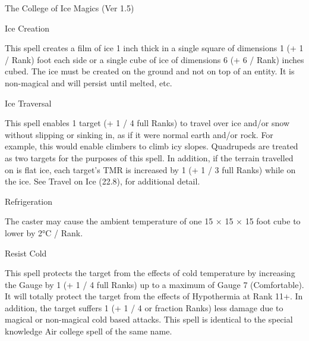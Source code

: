 \begin{Chapter}{The College of Ice Magics (Ver 1.5)}
\begin{spell}[G-3]{Ice Creation}
\begin{effects}
This spell creates a film of ice 1 inch thick in a single square of
dimensions 1 (+ 1 / Rank) foot each side or a single cube of ice of
dimensions 6 (+ 6 / Rank) inches cubed. The ice must be created on the
ground and not on top of an entity.  It is non-magical and will
persist until melted, etc.
\end{effects}
\end{spell}

\begin{spell}[G-4]{Ice Traversal}
\begin{effects}
This spell enables 1 target (+ 1 / 4 full Ranks) to travel over ice
and/or snow without slipping or sinking in, as if it were normal earth
and/or rock. For example, this would enable climbers to climb icy
slopes.  Quadrupeds are treated as two targets for the purposes of
this spell.  In addition, if the terrain travelled on is flat ice,
each target’s TMR is increased by 1 (+ 1 / 3 full Ranks) while on the
ice.  See Travel on Ice (22.8), for additional detail.
\end{effects}
\end{spell}

\begin{spell}[G-5]{Refrigeration}
\begin{effects}
The caster may cause the ambient temperature of one 15 × 15 × 15 foot
cube to lower by 2°C / Rank.
\end{effects}
\end{spell}

\begin{spell}[G-6]{Resist Cold}
\begin{effects}
This spell protects the target from the effects of cold temperature by
increasing the Gauge by 1 (+ 1 / 4 full Ranks) up to a maximum of
Gauge 7 (Comfortable). It will totally protect the target from the
effects of Hypothermia at Rank 11+.  In addition, the target suffers 1
(+ 1 / 4 or fraction Ranks) less damage due to magical or non-magical
cold based attacks.  This spell is identical to the special knowledge
Air college spell of the same name.
\end{effects}
\end{spell}


\end{Chapter}
